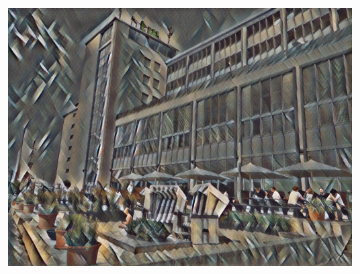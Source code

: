 \begin{figure}[H]
\begin{subfigure}[h]{0.32\textwidth}
        \includegraphics[width=\textwidth]{resources/content/experiments/htw-vgg16_still_life_with_liqueur_bottle.jpg}
    \end{subfigure}



\end{figure}

